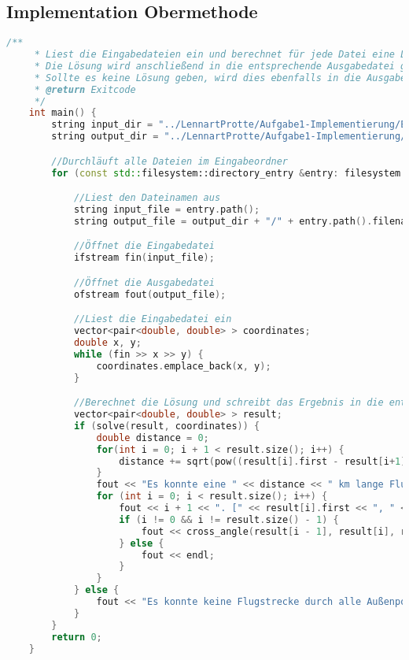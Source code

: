 \documentclass[a4paper,10pt,ngerman]{scrartcl}
\begin{document}
    \subsection{Implementation Obermethode}\label{subsec:implementation-obermethode}
    \begin{lstlisting}[frame=single,language=C++,title=Methode main,breaklines=true,label={lst:code_main}]
    /**
     * Liest die Eingabedateien ein und berechnet für jede Datei eine Lösung entsprechend der Aufgabenstellung.
     * Die Lösung wird anschließend in die entsprechende Ausgabedatei geschrieben.
     * Sollte es keine Lösung geben, wird dies ebenfalls in die Ausgabedatei geschrieben.
     * @return Exitcode
     */
    int main() {
        string input_dir = "../LennartProtte/Aufgabe1-Implementierung/Eingabedateien";
        string output_dir = "../LennartProtte/Aufgabe1-Implementierung/Ausgabedateien";

        //Durchläuft alle Dateien im Eingabeordner
        for (const std::filesystem::directory_entry &entry: filesystem::directory_iterator(input_dir)) {

            //Liest den Dateinamen aus
            string input_file = entry.path();
            string output_file = output_dir + "/" + entry.path().filename().string();

            //Öffnet die Eingabedatei
            ifstream fin(input_file);

            //Öffnet die Ausgabedatei
            ofstream fout(output_file);

            //Liest die Eingabedatei ein
            vector<pair<double, double> > coordinates;
            double x, y;
            while (fin >> x >> y) {
                coordinates.emplace_back(x, y);
            }

            //Berechnet die Lösung und schreibt das Ergebnis in die entsprechende Ausgabedatei
            vector<pair<double, double> > result;
            if (solve(result, coordinates)) {
                double distance = 0;
                for(int i = 0; i + 1 < result.size(); i++) {
                    distance += sqrt(pow((result[i].first - result[i+1].first), 2.0) + (pow((result[i].second - result[i+1].second), 2.0)));
                }
                fout << "Es konnte eine " << distance << " km lange Flugstrecke durch alle Außenposten ermittelt werden." << endl;
                for (int i = 0; i < result.size(); i++) {
                    fout << i + 1 << ". [" << result[i].first << ", " << result[i].second << "] ";
                    if (i != 0 && i != result.size() - 1) {
                        fout << cross_angle(result[i - 1], result[i], result[i + 1]) << "° " << endl;
                    } else {
                        fout << endl;
                    }
                }
            } else {
                fout << "Es konnte keine Flugstrecke durch alle Außenposten ermittelt werden." << endl;
            }
        }
        return 0;
    }
    \end{lstlisting}
\end{document}
